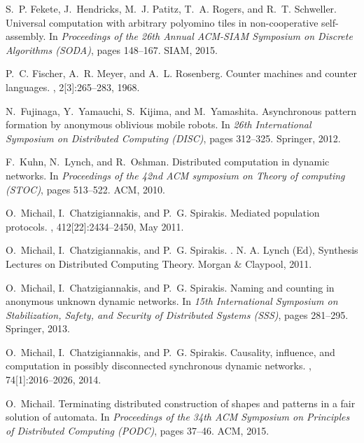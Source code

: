 \documentclass[preprint]{elsarticle}
\begin{document}
\begin{thebibliography}{CKLWL09}
S.~P. Fekete, J.~Hendricks, M.~J. Patitz, T.~A. Rogers, and R.~T. Schweller.
\newblock Universal computation with arbitrary polyomino tiles in
  non-cooperative self-assembly.
\newblock In {\em Proceedings of the 26th Annual ACM-SIAM Symposium on Discrete
  Algorithms (SODA)}, pages 148--167. SIAM, 2015.

P.~C. Fischer, A.~R. Meyer, and A.~L. Rosenberg.
\newblock Counter machines and counter languages.
, 2[3]:265--283, 1968.

N.~Fujinaga, Y.~Yamauchi, S.~Kijima, and M.~Yamashita.
\newblock Asynchronous pattern formation by anonymous oblivious mobile robots.
\newblock In {\em 26th International Symposium on Distributed Computing
  (DISC)}, pages 312--325. Springer, 2012.

F.~Kuhn, N.~Lynch, and R.~Oshman.
\newblock Distributed computation in dynamic networks.
\newblock In {\em Proceedings of the 42nd ACM symposium on Theory of computing
  (STOC)}, pages 513--522. ACM, 2010.

O.~Michail, I.~Chatzigiannakis, and P.~G. Spirakis.
\newblock Mediated population protocols.
, 412[22]:2434--2450, May 2011.

O.~Michail, I.~Chatzigiannakis, and P.~G. Spirakis.
.
\newblock N. A. Lynch (Ed), Synthesis Lectures on Distributed Computing Theory.
  Morgan \& Claypool, 2011.

O.~Michail, I.~Chatzigiannakis, and P.~G. Spirakis.
\newblock Naming and counting in anonymous unknown dynamic networks.
\newblock In {\em 15th International Symposium on Stabilization, Safety, and
  Security of Distributed Systems (SSS)}, pages 281--295. Springer, 2013.

O.~Michail, I.~Chatzigiannakis, and P.~G. Spirakis.
\newblock Causality, influence, and computation in possibly disconnected
  synchronous dynamic networks.
,
  74[1]:2016--2026, 2014.

O.~Michail.
\newblock Terminating distributed construction of shapes and patterns in a fair
  solution of automata.
\newblock In {\em Proceedings of the 34th ACM Symposium on Principles of
  Distributed Computing (PODC)}, pages 37--46. ACM, 2015.


\end{thebibliography}
\end{document}
